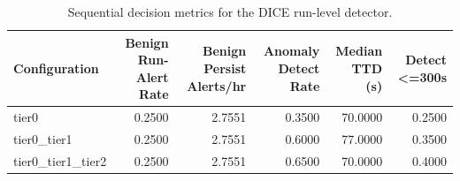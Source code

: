 \begin{table}[t]
\centering
\caption{Sequential decision metrics for the DICE run-level detector.}
\label{tab:dice_sequential_metrics}
\footnotesize
\begin{tabular}{lrrrrr}
\toprule
Configuration & Benign Run-Alert Rate & Benign Persist Alerts/hr & Anomaly Detect Rate & Median TTD (s) & Detect <=300s \\
\midrule
tier0 & 0.2500 & 2.7551 & 0.3500 & 70.0000 & 0.2500 \\
tier0_tier1 & 0.2500 & 2.7551 & 0.6000 & 77.0000 & 0.3500 \\
tier0_tier1_tier2 & 0.2500 & 2.7551 & 0.6500 & 70.0000 & 0.4000 \\
\bottomrule
\end{tabular}

\end{table}
